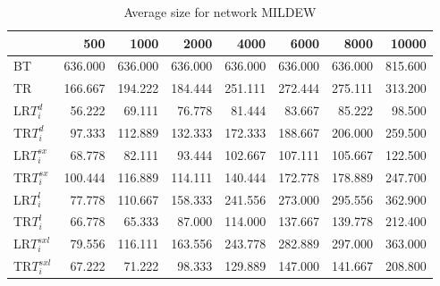 \begin{table}
\begin{center}
\begin{tabular}{lrrrrrrr}
 & 500 & 1000 & 2000 & 4000 & 6000 & 8000 & 10000\\\hline
BT & 636.000 & 636.000 & 636.000 & 636.000 & 636.000 & 636.000 & 815.600\\\hline
TR & 166.667 & 194.222 & 184.444 & 251.111 & 272.444 & 275.111 & 313.200\\\hline
LR$T_i^d$ & 56.222 & 69.111 & 76.778 & 81.444 & 83.667 & 85.222 & 98.500\\\hline
TR$T_i^d$ & 97.333 & 112.889 & 132.333 & 172.333 & 188.667 & 206.000 & 259.500\\\hline
LR$T_i^{sx}$ & 68.778 & 82.111 & 93.444 & 102.667 & 107.111 & 105.667 & 122.500\\\hline
TR$T_i^{sx}$ & 100.444 & 116.889 & 114.111 & 140.444 & 172.778 & 178.889 & 247.700\\\hline
LR$T_i^l$ & 77.778 & 110.667 & 158.333 & 241.556 & 273.000 & 295.556 & 362.900\\\hline
TR$T_i^l$ & 66.778 & 65.333 & 87.000 & 114.000 & 137.667 & 139.778 & 212.400\\\hline
LR$T_i^{sxl}$ & 79.556 & 116.111 & 163.556 & 243.778 & 282.889 & 297.000 & 363.000\\\hline
TR$T_i^{sxl}$ & 67.222 & 71.222 & 98.333 & 129.889 & 147.000 & 141.667 & 208.800\\\hline
\end{tabular}
\end{center}
\caption{Average size for network MILDEW }
\label{Mildewsi}
\end{table}

